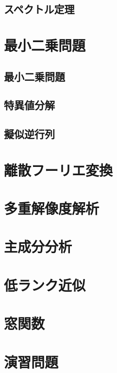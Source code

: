 \documentclass[../../main]{subfiles}
\begin{document}
\subsection{スペクトル定理}

\section{最小二乗問題}
\subsection{最小二乗問題}
\subsection{特異値分解}
\subsection{擬似逆行列}

\section{離散フーリエ変換}

\section{多重解像度解析}

\begin{subappendices}
\section{主成分分析}
\section{低ランク近似}
\section{窓関数}
\end{subappendices}

\section*{演習問題}
\end{document}

